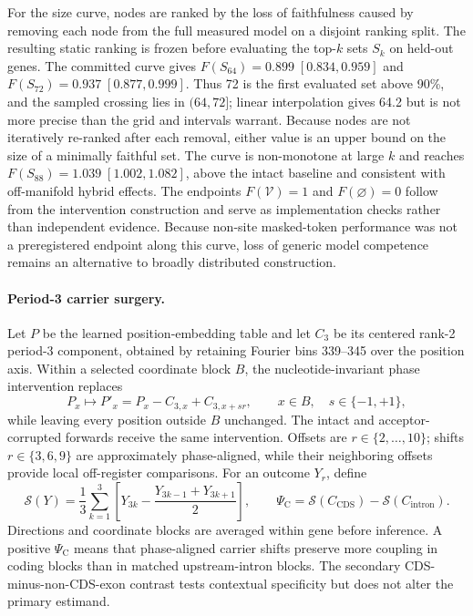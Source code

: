\documentclass{article}
\begin{document}
For the size curve, nodes are ranked by the loss of faithfulness caused by removing each node from the full measured model on a disjoint ranking split. The resulting static ranking is frozen before evaluating the top-\(k\) sets \(S_k\) on held-out genes. The committed curve gives \(F(S_{64})=0.899\;[0.834,0.959]\) and \(F(S_{72})=0.937\;[0.877,0.999]\). Thus 72 is the first evaluated set above 90\%, and the sampled crossing lies in \((64,72]\); linear interpolation gives 64.2 but is not more precise than the grid and intervals warrant. Because nodes are not iteratively re-ranked after each removal, either value is an upper bound on the size of a minimally faithful set. The curve is non-monotone at large \(k\) and reaches \(F(S_{88})=1.039\;[1.002,1.082]\), above the intact baseline and consistent with off-manifold hybrid effects. The endpoints \(F(\mathcal{V})=1\) and \(F(\varnothing)=0\) follow from the intervention construction and serve as implementation checks rather than independent evidence. Because non-site masked-token performance was not a preregistered endpoint along this curve, loss of generic model competence remains an alternative to broadly distributed construction.

\paragraph{Period-3 carrier surgery.}
Let \(P\) be the learned position-embedding table and let \(C_3\) be its centered rank-2 period-3 component, obtained by retaining Fourier bins 339--345 over the position axis. Within a selected coordinate block \(B\), the nucleotide-invariant phase intervention replaces
\begin{equation}
P_x
\longmapsto
P'_x
=
P_x-C_{3,x}+C_{3,x+s r},
\qquad
x\in B,\quad
s\in\{-1,+1\},
\label{eq:carrier_surgery}
\end{equation}
while leaving every position outside \(B\) unchanged. The intact and acceptor-corrupted forwards receive the same intervention. Offsets are \(r\in\{2,\ldots,10\}\); shifts \(r\in\{3,6,9\}\) are approximately phase-aligned, while their neighboring offsets provide local off-register comparisons. For an outcome \(Y_r\), define
\begin{equation}
\mathcal{S}(Y)
=
\frac{1}{3}\sum_{k=1}^{3}
\left[
Y_{3k}
-\frac{Y_{3k-1}+Y_{3k+1}}{2}
\right],
\qquad
\Psi_{\mathrm C}
=
\mathcal{S}(C_{\mathrm{CDS}})
-\mathcal{S}(C_{\mathrm{intron}}).
\label{eq:phase_alignment}
\end{equation}
Directions and coordinate blocks are averaged within gene before inference. A positive \(\Psi_{\mathrm C}\) means that phase-aligned carrier shifts preserve more coupling in coding blocks than in matched upstream-intron blocks. The secondary CDS-minus-non-CDS-exon contrast tests contextual specificity but does not alter the primary estimand.
\end{document}
